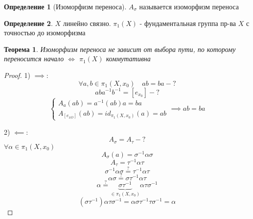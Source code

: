 \documentclass[a4paper]{article}
\newtheorem*{theorem}{Теорема}
\theoremstyle{definition}
\newtheorem*{definition}{Определение}
\theoremstyle{remark}
\begin{document}
\begin{tcolorbox}[title=Изоморфизм переноса]
    \begin{definition}[Изоморфизм переноса]
        $ A_{\sigma} $ называется изоморфизм переноса
    \end{definition}
\end{tcolorbox}

\begin{tcolorbox}
    \begin{definition}
        $ X $ линейно связно. $ \pi_1(X) $ - фундаментальная группа пр-ва $ X $ 
        с точностью до изоморфизма
    \end{definition}
\end{tcolorbox}

\begin{tcolorbox}
    \begin{theorem}
        Изоморфизм переноса не зависит от выбора пути, по которому переносится
        начало $ \iff $ $ \pi_1(X) $ коммутативна
    \end{theorem}

    \begin{proof}
        1) $ \implies: $ 
        \[
            \forall a,b \in \pi_1(X, x_0) \quad ab = ba - ?
        \]
        \[
            aba^{-1}b^{-1} = [e_{x_0}] - ?
        \]
        \[
            \begin{cases}
                A_a(ab) = a^{-1}(ab)a = ba\\
                A_{[e_{xO}]}(ab) = id_{\pi_1(X, x_0)}(a) = ab
            \end{cases}
            \implies ab = ba
        \]

        2) $ \impliedby: $ 
        \[
            A_{\sigma} = A_{\tau} - ?
        \]
        $ \forall \alpha \in \pi_1(X, x_0) $ 
        \[
            A_{\sigma}(a) = \sigma^{-1} \alpha \sigma
        \]
        \[
            A_{\tau} = \tau^{-1} \alpha \tau
        \]
        \[
            \sigma^{-1} \alpha \sigma \stackrel{?}{=} \tau^{-1} \alpha \tau
        \]
        \[
            \alpha \sigma \stackrel{?}{=} \sigma \tau^{-1} \alpha \tau
        \]
        \[
            \alpha \stackrel{?}{=} \underbrace{\sigma\tau^{-1}}_{\in \pi_1(X,x_0)}
            \alpha \tau \sigma^{-1}
        \]
        \[
            (\sigma \tau^{-1}) \alpha \tau \sigma^{-1} = \alpha \sigma \tau^{-1}
            \tau \sigma^{-1} = \alpha
        \]
    \end{proof}
\end{tcolorbox}
\end{document}
